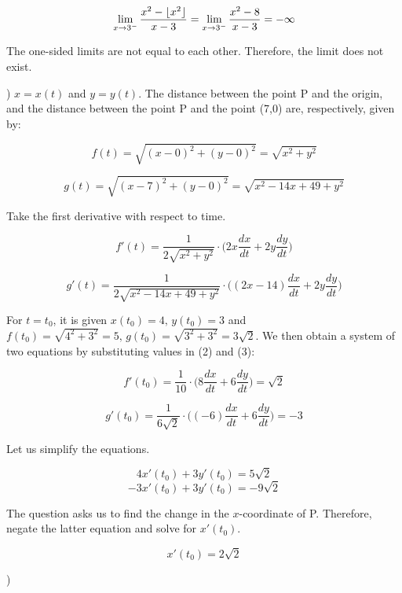 \documentclass{article}
\DeclarePairedDelimiter\floor{\lfloor}{\rfloor}
\begin{document}
\[ \lim_{x\to 3^-} \frac{x^2-\floor{x^2}}{x-3} = \lim_{x\to 3^-}\frac{x^2-8}{x-3} = -\infty\]

\hfill

\noindent The one-sided limits are not equal to each other. Therefore, the limit does not exist.

\hfill

) $x=x(t)$ and $y=y(t)$. The distance between the point P and the origin, and the distance between the point P and the point (7,0) are, respectively, given by:

\[f(t) = \sqrt{(x-0)^2 + (y-0)^2} = \sqrt{x^2+y^2}\]

\[g(t) = \sqrt{(x-7)^2 + (y-0)^2} = \sqrt{x^2-14x +49+y^2}\]

\hfill

\noindent Take the first derivative with respect to time.

\begin{equation}f'(t) =\frac{1}{2\sqrt{x^2+y^2}}\cdot\Big(2x\frac{dx}{dt} + 2y\frac{dy}{dt}\Big)\end{equation}

\begin{equation}g'(t) =\frac{1}{2\sqrt{x^2-14x +49+y^2}}\cdot\Big((2x-14)\frac{dx}{dt} + 2y\frac{dy}{dt}\Big)\end{equation}

\hfill

\noindent For $t=t_0$, it is given $x(t_0) = 4,\,y(t_0) = 3$ and $f(t_0) = \sqrt{4^2 +3^2} = 5,\,g(t_0) = \sqrt{3^2 + 3^2} = 3\sqrt{2}$. We then obtain a system of two equations by substituting values in (2) and (3):

\[f'(t_0) =\frac{1}{10}\cdot\Big(8\frac{dx}{dt}+6\frac{dy}{dt}\Big) = \sqrt{2} \]

\[g'(t_0) =\frac{1}{6\sqrt{2}}\cdot\Big((-6)\frac{dx}{dt} + 6\frac{dy}{dt}\Big) = -3\]

\hfill

\noindent Let us simplify the equations.

\[4x'(t_0)+3y'(t_0) = 5\sqrt{2} \]
\[-3x'(t_0)+3y'(t_0) = -9\sqrt{2} \]

\hfill

\noindent The question asks us to find the change in the $x$-coordinate of P. Therefore, negate the latter equation and solve for $x'(t_0)$.

\[ \boxed{x'(t_0) = 2\sqrt{2}} \]

\hfill

)
\end{document}

